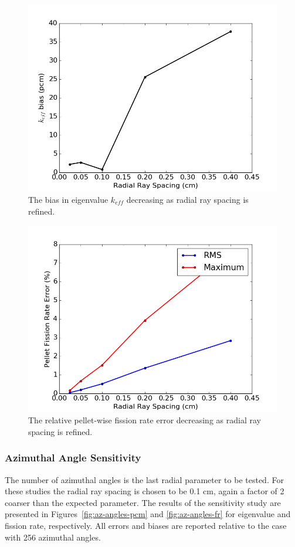 \begin{figure}[h!]
	\centering
	\includegraphics[width=0.7\linewidth]{figures/results/sensitivity/rad_spacing_pcm.png}
	\caption[]{The bias in eigenvalue $k_{\textit{eff}}$ decreasing as radial ray spacing is refined.}
	\label{fig:radial-rs-pcm}
\end{figure}
\begin{figure}[h!]
	\centering
	\includegraphics[width=0.7\linewidth]{figures/results/sensitivity/rad_spacing_fr.png}
	\caption[]{The relative pellet-wise fission rate error decreasing as radial ray spacing is refined.}
	\label{fig:radial-rs-fr}
\end{figure}

\newpage
\subsubsection{Azimuthal Angle Sensitivity}

The number of azimuthal angles is the last radial parameter to be tested. For these studies the radial ray spacing is chosen to be 0.1 cm, again a factor of 2 coarser than the expected parameter. The results of the sensitivity study are presented in Figures~\ref{fig:az-angles-pcm} and \ref{fig:az-angles-fr} for eigenvalue and fission rate, respectively. All errors and biases are reported relative to the case with 256 azimuthal angles.

